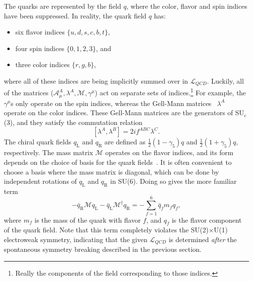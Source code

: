 The quarks are represented by the field $q$, where the color, flavor and spin indices have been suppressed. In reality, the quark field $q$ has:
%
\begin{itemize}
    \item six flavor indices $\{u, d, s, c, b, t\}$,
    \item four spin indices $\{0, 1, 2, 3\}$, and
    \item three color indices $\{r, g, b\}$,
\end{itemize}
%
where all of these indices are being implicitly summed over in $\mathcal{L}_{QCD}$. Luckily, all of the matrices ($\mathcal{A}_\mu^A, \lambda^A, \mathcal{M}, \gamma^\mu$) act on separate sets of indices.\footnote{Really the components of the field corresponding to those indices.} For example, the $\gamma^\mu$s only operate on the spin indices, whereas the Gell-Mann matrices~\cite{GellMannEightfold} $\lambda^A$ operate on the color indices. These Gell-Mann matrices are the generators of SU$_\text{c}$(3), and they satisfy the commutation relation
%
\begin{equation}
    \label{eq:gell_mann_commutation}
    [\lambda^A, \lambda^B] = 2if^{ABC}\lambda^C.
\end{equation}
%
The chiral quark fields $q_\text{L}$ and $q_\text{R}$ are defined as $\frac{1}{2}(1 - \gamma_5)q$ and $\frac{1}{2}(1 + \gamma_5)q$, respectively. The mass matrix $\mathcal{M}$ operates on the flavor indices, and its form depends on the choice of basis for the quark fields~\cite{QCDHistory}. It is often convenient to choose a basis where the mass matrix is diagonal, which can be done by independent rotations of $q_\text{L}$ and $q_\text{R}$ in SU(6). Doing so gives the more familiar term
%
\begin{equation}
    -\bar{q}_{\mathrm{R}} \mathcal{M} q_{\mathrm{L}}-\bar{q}_{\mathrm{L}} \mathcal{M}^{\dagger} q_{\mathrm{R}} = -\sum_{f = 1}^{6}\bar{q}_f m_f q_f,
    \label{eq:mass_matrix}
\end{equation}
where $m_f$ is the mass of the quark with flavor $f$, and $q_f$ is the flavor component of the quark field. Note that this term completely violates the SU(2)$\times$U(1) electroweak symmetry, indicating that the given $\mathcal{L}_{QCD}$ is determined \textit{after} the spontaneous symmetry breaking described in the previous section. 

